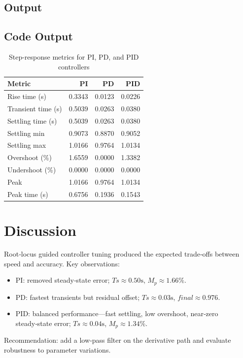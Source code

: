 \documentclass[12pt]{article}
\begin{document}
\subsection*{Output}


\subsection*{Code Output}
\begin{table}[H]
  \centering
  \label{tab:stepinfo}
  \footnotesize
  \begin{tabular}{l r r r}
    \hline
    Metric             & PI     & PD     & PID    \\
    \hline
    Rise time (s)      & 0.3343 & 0.0123 & 0.0226 \\
    Transient time (s) & 0.5039 & 0.0263 & 0.0380 \\
    Settling time (s)  & 0.5039 & 0.0263 & 0.0380 \\
    Settling min       & 0.9073 & 0.8870 & 0.9052 \\
    Settling max       & 1.0166 & 0.9764 & 1.0134 \\
    Overshoot (\%)     & 1.6559 & 0.0000 & 1.3382 \\
    Undershoot (\%)    & 0.0000 & 0.0000 & 0.0000 \\
    Peak               & 1.0166 & 0.9764 & 1.0134 \\
    Peak time (s)      & 0.6756 & 0.1936 & 0.1543 \\
    \hline
  \end{tabular}
  \caption{Step-response metrics for PI, PD, and PID controllers}
\end{table}

\section*{Discussion}
Root‑locus guided controller tuning produced the expected trade‑offs between speed and accuracy. Key observations:
\begin{itemize}
  \item PI: removed steady‑state error; $Ts \approx 0.50 \mathrm{s}$, $M_p \approx 1.66\%$.
  \item PD: fastest transients but residual offset; $Ts \approx 0.03 \mathrm{s}$, $final \approx 0.976$.
  \item PID: balanced performance—fast settling, low overshoot, near‑zero steady‑state error; $Ts \approx 0.04 \mathrm{s}$, $M_p \approx 1.34\%$.
\end{itemize}
Recommendation: add a low‑pass filter on the derivative path and evaluate robustness to parameter variations.
\end{document}
